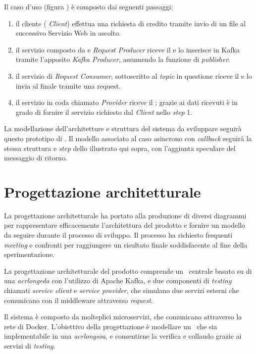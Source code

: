 \noindent
Il caso d'uso (figura \thefigure) è composto dai seguenti passaggi:
\begin{enumerate}
  \item il cliente (\textit{ Client}) effettua una richiesta di credito tramite invio di un file  al successivo Servizio Web in ascolto.
  \item il servizio composto da   e \textit{Request Producer} riceve il  e lo inserisce in Kafka tramite l'apposito \textit{Kafka Producer}, assumendo la funzione di \textit{publisher}.
  \item il servizio di \textit{Request Consumer}, sottoscritto al \textit{topic} in questione riceve il  e lo invia al  finale tramite una  request.
  \item il servizio in coda chiamato  \textit{Provider} riceve il ; grazie ai dati ricevuti è in grado di fornire il servizio richiesto dal \textit{Client} nello \textit{step} 1.
\end{enumerate}

La modellazione dell'architetture e struttura del sistema da sviluppare seguirà questo prototipo di .
Il modello associato al caso asincrono con \textit{callback} seguirà la stessa struttura e \textit{step} dello  illustrato qui sopra, con l'aggiunta speculare del messaggio di ritorno.

\section{Progettazione architetturale}

La progettazione architetturale ha portato alla produzione di diversi diagrammi  per rappresentare efficacemente l'architettura del prodotto e fornire un modello da seguire durante il processo di sviluppo.
Il processo ha richiesto frequenti \textit{meeting} e confronti per raggiungere un risultato finale soddisfacente al fine della sperimentazione.

La progettazione architetturale del prodotto comprende un \middleware\ centrale basato su di una \textit{acrlong{eda}} con l'utilizzo di Apache Kafka, e due componenti di \textit{testing} chiamati \textit{service client} e \textit{service provider}, che simulano due servizi esterni che comunicano con il middleware attraverso  \textit{request}.

Il sistema è composto da molteplici microservizi, che comunicano attraverso la rete di Docker.
L'obiettivo della progettazione è modellare un \middleware\ che sia implementabile in una \textit{acrlong{soa}}, e consentirne la verifica e collaudo grazie ai servizi di \textit{testing}.

